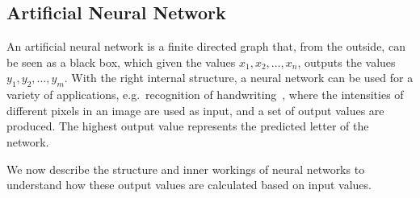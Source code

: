 \subsection{Artificial Neural Network}
An artificial neural network is a finite directed graph that, from the outside, can be seen as a black box, which given the values $x_1, x_2, \dots, x_n$, outputs the values $y_1, y_2, \dots, y_m$. With the right internal structure, a neural network can be used for a variety of applications, e.g.\ recognition of handwriting~\cite{Widrow:1994:NNA:175247.175257}, where the intensities of different pixels in an image are used as input, and a set of output values are produced. The highest output value represents the predicted letter of the network.

We now describe the structure and inner workings of neural networks to understand how these output values are calculated based on input values.

